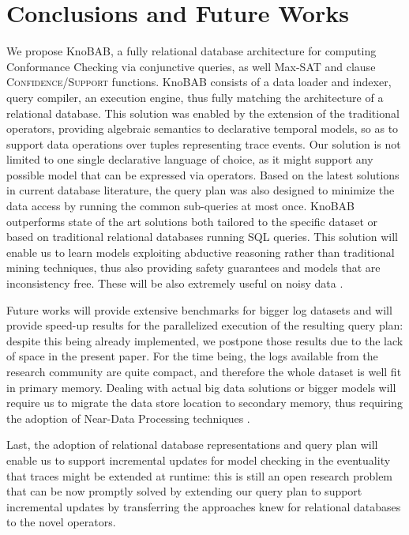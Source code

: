 \section{Conclusions and Future Works}
We propose KnoBAB, a fully relational database architecture for computing Conformance Checking via conjunctive queries, as well Max-SAT and clause \textsc{Confidence}/\textsc{Support} functions.  KnoBAB consists of a data loader and indexer, query compiler, an execution engine, thus fully matching the architecture of a relational database. This solution was enabled by the extension of the traditional \LTLf operators, providing algebraic semantics to declarative temporal models, so as to support data operations over tuples representing trace  events. Our solution is not limited to one single declarative language of choice, as it might support any possible model that can be expressed via \xLTLf operators. Based on the latest solutions in current database literature, the query plan was also designed to minimize the data access by running the common sub-queries at most once.
%
KnoBAB outperforms state of the art solutions both tailored to the specific dataset or based on traditional relational databases running SQL queries.  This solution will enable us to learn models exploiting abductive reasoning rather than traditional mining techniques, thus also providing safety guarantees and models that are inconsistency free. These will be also extremely useful on  noisy data \cite{PicadoDTL20}.

Future works will provide extensive benchmarks for bigger log datasets and will provide speed-up results for the parallelized execution of the resulting query plan: despite this being already implemented, we postpone those results due to the lack of space in the present paper. For the time being, the logs available from the research community are quite compact, and therefore the whole dataset is well fit in primary memory. Dealing with actual big data solutions or bigger models will require us to migrate the data store location to secondary memory, thus requiring the adoption of Near-Data Processing techniques \cite{GuYBJLYKKYCJC16}. 

Last, 
the adoption of relational database representations and query plan will enable us to support incremental updates for model checking in the eventuality that traces might be extended at runtime: this is still an open research problem \cite{Polyvyanyy2022} that can be now promptly solved by extending our query plan to support incremental updates by transferring the approaches knew for relational databases to the novel \xLTLf operators. 

